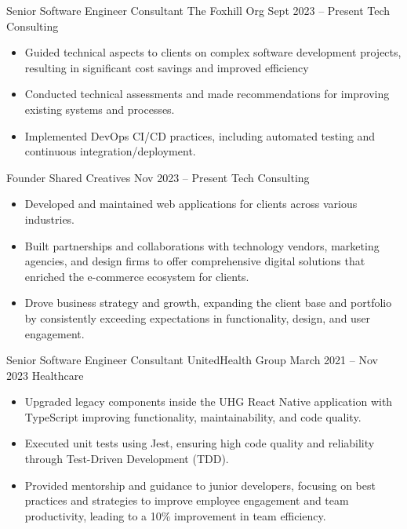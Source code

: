 
\cvexperience
{Senior Software Engineer Consultant}
{The Foxhill Org}
{Sept 2023 – Present}
{Tech Consulting}
{\footnotesize\faCode \hspace{1pt}     }
\begin{itemize}
    \item Guided technical aspects to clients on complex software development projects, resulting in significant cost savings and improved efficiency
    \item Conducted technical assessments and made recommendations for improving existing systems and processes.
    \item Implemented DevOps CI/CD practices, including automated testing and continuous integration/deployment.

\end{itemize}

\medskip

\cvexperience
{Founder}
{Shared Creatives}
{Nov 2023 – Present}
{Tech Consulting}
{\footnotesize\faCode \hspace{1pt}   }
\begin{itemize}
    \item Developed and maintained web applications for clients across various industries.
    \item Built partnerships and collaborations with technology vendors, marketing agencies, and design firms to offer comprehensive digital solutions that enriched the e-commerce ecosystem for clients.
    \item Drove business strategy and growth, expanding the client base and portfolio by consistently exceeding expectations in functionality, design, and user engagement.
\end{itemize}

\medskip

\cvexperience
{Senior Software Engineer Consultant}
{UnitedHealth Group}
{March 2021 – Nov 2023}
{Healthcare}
{\footnotesize\faCode \hspace{.5pt}        }
\begin{itemize}
    \item Upgraded legacy components inside the UHG React Native application with TypeScript improving functionality, maintainability, and code quality.
    \item Executed unit tests using Jest, ensuring high code quality and reliability through Test-Driven Development (TDD).
    \item Provided mentorship and guidance to junior developers, focusing on best practices and strategies to improve employee engagement and team productivity, leading to a 10\% improvement in team efficiency.
\end{itemize}

